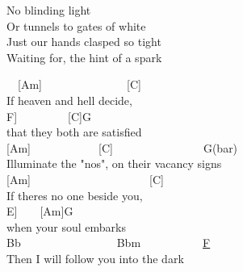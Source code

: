 \documentclass[
  letterpaper,
  a5paper]{memoir}
\begin{document}
No blinding light\\
Or tunnels to gates of white\\
Just our hands clasped so tight\\
Waiting for, the hint of a spark

\begin{tcolorbox}[enhanced jigsaw, breakable, bottomrule=.15mm, colframe=quarto-callout-color-frame, rightrule=.15mm, opacityback=0, colback=white, arc=.35mm, toprule=.15mm, leftrule=.75mm, left=2mm]

~~{[}Am{]}~~~~~~~~~~~~~~~{[}C{]}~~~~~\\
If heaven and hell decide,~~~~~~\\
\hspace*{0.333em}\hspace*{0.333em}\hspace*{0.333em}\hspace*{0.333em}\hspace*{0.333em}\hspace*{0.333em}\hspace*{0.333em}\hspace*{0.333em}\hspace*{0.333em}\hspace*{0.333em}{[}F{]}~~~~~~~~~{[}C{]}G\\
that they both are satisfied\\
{[}Am{]}~~~~~~~~~~~~{[}C{]}~~~~~~~~~~~~~~~~G(bar)\\
Illuminate the "no\textquotesingle s", on their vacancy signs\\
{[}Am{]}~~~~~~~~~~~~~~~~~~~~~{[}C{]}\\
If there\textquotesingle s no one beside you,\\
\hspace*{0.333em}\hspace*{0.333em}\hspace*{0.333em}\hspace*{0.333em}\hspace*{0.333em}\hspace*{0.333em}\hspace*{0.333em}\hspace*{0.333em}\hspace*{0.333em}\hspace*{0.333em}{[}E{]}~~~~{[}Am{]}G\\
when your soul embarks\\
Bb~~~~~~~~~~~~~~~~~Bbm~~~~~~~~~~~\href{C\%20root\%20note}{F}\\
Then I will follow you into the dark

\end{tcolorbox}
\end{document}
